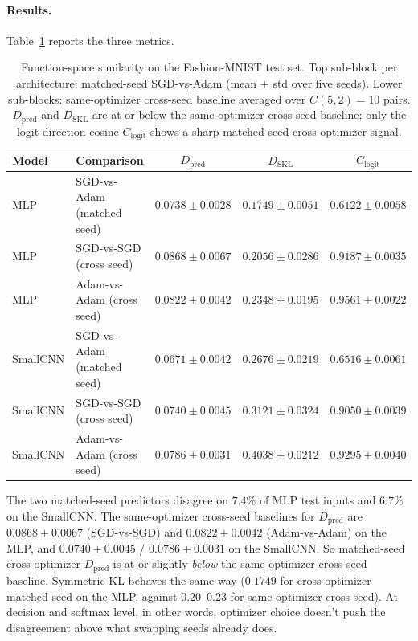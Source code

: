 \documentclass[11pt]{article}
\begin{document}
\paragraph{Results.} Table~\ref{tab:function-space} reports the three metrics.

\begin{table}[H]
\centering
\small
\begin{tabular}{llccc}
\toprule
\textbf{Model} & \textbf{Comparison} & $D_{\mathrm{pred}}$ & $D_{\mathrm{SKL}}$ & $C_{\mathrm{logit}}$ \\
\midrule
MLP      & SGD-vs-Adam (matched seed) & $0.0738 \pm 0.0028$ & $0.1749 \pm 0.0051$ & $0.6122 \pm 0.0058$ \\
MLP      & SGD-vs-SGD (cross seed)    & $0.0868 \pm 0.0067$ & $0.2056 \pm 0.0286$ & $0.9187 \pm 0.0035$ \\
MLP      & Adam-vs-Adam (cross seed)  & $0.0822 \pm 0.0042$ & $0.2348 \pm 0.0195$ & $0.9561 \pm 0.0022$ \\
\addlinespace
SmallCNN & SGD-vs-Adam (matched seed) & $0.0671 \pm 0.0042$ & $0.2676 \pm 0.0219$ & $0.6516 \pm 0.0061$ \\
SmallCNN & SGD-vs-SGD (cross seed)    & $0.0740 \pm 0.0045$ & $0.3121 \pm 0.0324$ & $0.9050 \pm 0.0039$ \\
SmallCNN & Adam-vs-Adam (cross seed)  & $0.0786 \pm 0.0031$ & $0.4038 \pm 0.0212$ & $0.9295 \pm 0.0040$ \\
\bottomrule
\end{tabular}
\caption{Function-space similarity on the Fashion-MNIST test set. Top sub-block per architecture: matched-seed SGD-vs-Adam (mean $\pm$ std over five seeds). Lower sub-blocks: same-optimizer cross-seed baseline averaged over $C(5,2)=10$ pairs. $D_{\mathrm{pred}}$ and $D_{\mathrm{SKL}}$ are at or below the same-optimizer cross-seed baseline; only the logit-direction cosine $C_{\mathrm{logit}}$ shows a sharp matched-seed cross-optimizer signal.}
\label{tab:function-space}
\end{table}

The two matched-seed predictors disagree on $7.4\%$ of MLP test inputs and $6.7\%$ on the SmallCNN. The same-optimizer cross-seed baselines for $D_{\mathrm{pred}}$ are $0.0868 \pm 0.0067$ (SGD-vs-SGD) and $0.0822 \pm 0.0042$ (Adam-vs-Adam) on the MLP, and $0.0740 \pm 0.0045$ / $0.0786 \pm 0.0031$ on the SmallCNN. So matched-seed cross-optimizer $D_{\mathrm{pred}}$ is at or slightly \emph{below} the same-optimizer cross-seed baseline. Symmetric KL behaves the same way ($0.1749$ for cross-optimizer matched seed on the MLP, against $0.20$--$0.23$ for same-optimizer cross-seed). At decision and softmax level, in other words, optimizer choice doesn't push the disagreement above what swapping seeds already does.
\end{document}
